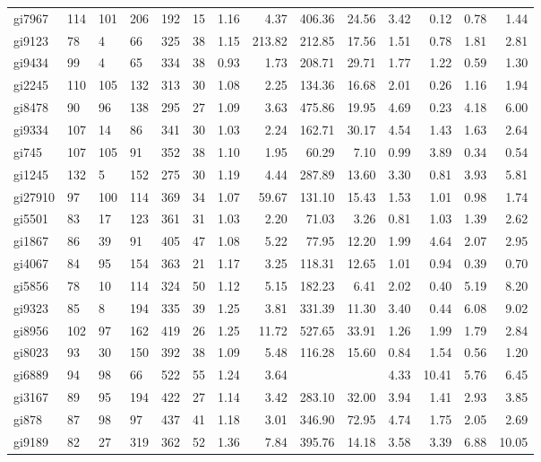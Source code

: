 \documentclass[runningheads]{llncs}
\begin{document}
{\begin{longtable}{l lllll rrrr rrrr }
gi7967 & 114 & 101 & 206 & 192 & 15 & 1.16 & 4.37 & 406.36 & 24.56 & 3.42 & 0.12 & 0.78 & 1.44 \\
gi9123 & 78 & 4 & 66 & 325 & 38 & 1.15 & 213.82 & 212.85 & 17.56 & 1.51 & 0.78 & 1.81 & 2.81 \\
gi9434 & 99 & 4 & 65 & 334 & 38 & 0.93 & 1.73 & 208.71 & 29.71 & 1.77 & 1.22 & 0.59 & 1.30 \\
gi2245 & 110 & 105 & 132 & 313 & 30 & 1.08 & 2.25 & 134.36 & 16.68 & 2.01 & 0.26 & 1.16 & 1.94 \\
gi8478 & 90 & 96 & 138 & 295 & 27 & 1.09 & 3.63 & 475.86 & 19.95 & 4.69 & 0.23 & 4.18 & 6.00 \\
gi9334 & 107 & 14 & 86 & 341 & 30 & 1.03 & 2.24 & 162.71 & 30.17 & 4.54 & 1.43 & 1.63 & 2.64 \\
gi745 & 107 & 105 & 91 & 352 & 38 & 1.10 & 1.95 & 60.29 & 7.10 & 0.99 & 3.89 & 0.34 & 0.54 \\
gi1245 & 132 & 5 & 152 & 275 & 30 & 1.19 & 4.44 & 287.89 & 13.60 & 3.30 & 0.81 & 3.93 & 5.81 \\
gi27910 & 97 & 100 & 114 & 369 & 34 & 1.07 & 59.67 & 131.10 & 15.43 & 1.53 & 1.01 & 0.98 & 1.74 \\
gi5501 & 83 & 17 & 123 & 361 & 31 & 1.03 & 2.20 & 71.03 & 3.26 & 0.81 & 1.03 & 1.39 & 2.62 \\
gi1867 & 86 & 39 & 91 & 405 & 47 & 1.08 & 5.22 & 77.95 & 12.20 & 1.99 & 4.64 & 2.07 & 2.95 \\
gi4067 & 84 & 95 & 154 & 363 & 21 & 1.17 & 3.25 & 118.31 & 12.65 & 1.01 & 0.94 & 0.39 & 0.70 \\
gi5856 & 78 & 10 & 114 & 324 & 50 & 1.12 & 5.15 & 182.23 & 6.41 & 2.02 & 0.40 & 5.19 & 8.20 \\
gi9323 & 85 & 8 & 194 & 335 & 39 & 1.25 & 3.81 & 331.39 & 11.30 & 3.40 & 0.44 & 6.08 & 9.02 \\
gi8956 & 102 & 97 & 162 & 419 & 26 & 1.25 & 11.72 & 527.65 & 33.91 & 1.26 & 1.99 & 1.79 & 2.84 \\
gi8023 & 93 & 30 & 150 & 392 & 38 & 1.09 & 5.48 & 116.28 & 15.60 & 0.84 & 1.54 & 0.56 & 1.20 \\
gi6889 & 94 & 98 & 66 & 522 & 55 & 1.24 & 3.64 &  &  & 4.33 & 10.41 & 5.76 & 6.45 \\
gi3167 & 89 & 95 & 194 & 422 & 27 & 1.14 & 3.42 & 283.10 & 32.00 & 3.94 & 1.41 & 2.93 & 3.85 \\
gi878 & 87 & 98 & 97 & 437 & 41 & 1.18 & 3.01 & 346.90 & 72.95 & 4.74 & 1.75 & 2.05 & 2.69 \\
gi9189 & 82 & 27 & 319 & 362 & 52 & 1.36 & 7.84 & 395.76 & 14.18 & 3.58 & 3.39 & 6.88 & 10.05 \\

\end{longtable}}
\end{document}
